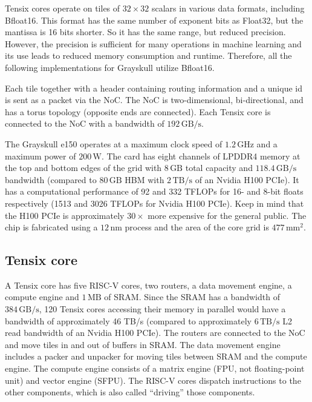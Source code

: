 \documentclass[conference]{IEEEtran}
\begin{document}
Tensix cores operate on tiles of \(32 \times 32\) scalars in various data formats, including Bfloat16. This format has the same number of exponent bits as Float32, but the mantissa is 16 bits shorter. So it has the same range, but reduced precision. However, the precision is sufficient for many operations in machine learning and its use leads to reduced memory consumption and runtime. Therefore, all the following implementations for Grayskull utilize Bfloat16. 

Each tile together with a header containing routing information and a unique id is sent as a packet via the NoC. The NoC is two-dimensional, bi-directional, and has a torus topology (opposite ends are connected). Each Tensix core is connected to the NoC with a bandwidth of \(192\,\text{GB/s}\). 

The Grayskull e150 operates at a maximum clock speed of \(1.2\,\text{GHz}\) and a maximum power of \(200\,\text{W}\). The card has eight channels of LPDDR4 memory at the top and bottom edges of the grid with \(8\,\text{GB}\) total capacity and \(118.4\,\text{GB/s}\) bandwidth (compared to \(80\,\text{GB}\) HBM with \(2\,\text{TB/s}\) of an Nvidia H100 PCIe). It has a computational performance of 92 and 332 TFLOPs for 16- and 8-bit floats respectively (1513 and 3026 TFLOPs for Nvidia H100 PCIe). Keep in mind that the H100 PCIe is approximately \(30\times\) more expensive for the general public. The chip is fabricated using a \(12\,\text{nm}\) process and the area of the core grid is \(477\,\text{mm}^2\). 

\subsection{Tensix core}
A Tensix core has five RISC-V \cite{waterman2014} cores, two routers, a data movement engine, a compute engine and \(1\,\text{MB}\) of SRAM. Since the SRAM has a bandwidth of \(384\,\text{GB/s}\), 120 Tensix cores accessing their memory in parallel would have a bandwidth of approximately 46 TB/s (compared to approximately \(6\,\text{TB/s}\) L2 read bandwidth \cite{lam2023} of an Nvidia H100 PCIe). The routers are connected to the NoC and move tiles in and out of buffers in SRAM. The data movement engine includes a packer and unpacker for moving tiles between SRAM and the compute engine. The compute engine consists of a matrix engine (FPU, not floating-point unit) and vector engine (SFPU). The RISC-V cores dispatch instructions to the other components, which is also called ``driving'' those components.
\end{document}
